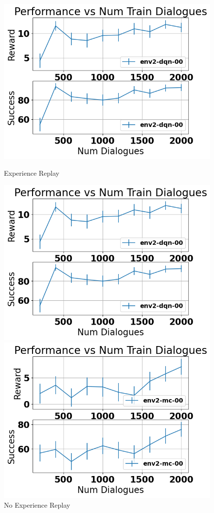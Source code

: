 \documentclass[12pt,titlepage,a4paper]{article}
\begin{document}
\begin{figure}[!htb]
      \includegraphics[width=\linewidth]{env2-CamRestaurants-experience.png}
      \caption{Experience Replay}
    \endminipage\hfill
      \includegraphics[width=\linewidth]{env2-CamRestaurants-experience.png}
      \caption{No Experience Replay}
    \endminipage\hfill
      \includegraphics[width=\linewidth]{env2-CamRestaurants-mc.png}

\end{figure}
\end{document}
